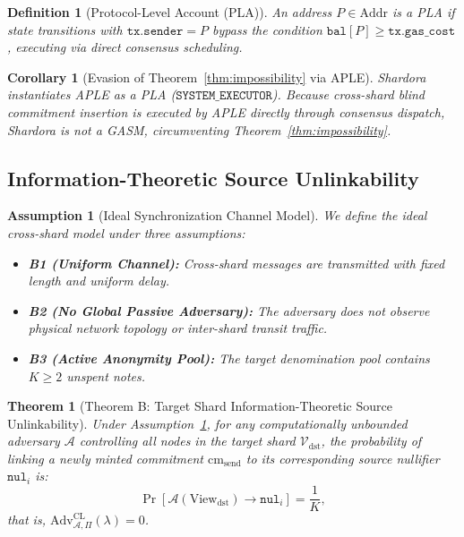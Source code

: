 \documentclass[sigconf,nonacm]{acmart}
\newtheorem{theorem}{Theorem}
\newtheorem{corollary}{Corollary}
\newtheorem{definition}{Definition}
\newtheorem{assumption}{Assumption}
\begin{document}
\begin{definition}[Protocol-Level Account (PLA)]
An address $P \in \text{Addr}$ is a PLA if state transitions with $\mathtt{tx.sender} = P$ bypass the condition $\mathtt{bal}[P] \ge \mathtt{tx.gas\_cost}$, executing via direct consensus scheduling.
\end{definition}

\begin{corollary}[Evasion of Theorem~\ref{thm:impossibility} via APLE]
Shardora instantiates APLE as a PLA ($\mathtt{SYSTEM\_EXECUTOR}$). Because cross-shard blind commitment insertion is executed by APLE directly through consensus dispatch, Shardora is not a GASM, circumventing Theorem~\ref{thm:impossibility}.
\end{corollary}

\subsection{Information-Theoretic Source Unlinkability}

\begin{assumption}[Ideal Synchronization Channel Model]\label{assump:ideal}
We define the ideal cross-shard model under three assumptions:
\begin{itemize}
    \item \textbf{B1 (Uniform Channel):} Cross-shard messages are transmitted with fixed length and uniform delay.
    \item \textbf{B2 (No Global Passive Adversary):} The adversary does not observe physical network topology or inter-shard transit traffic.
    \item \textbf{B3 (Active Anonymity Pool):} The target denomination pool contains $K \ge 2$ unspent notes.
\end{itemize}
\end{assumption}

\begin{theorem}[Theorem B: Target Shard Information-Theoretic Source Unlinkability]\label{thm:source_unlink}
Under Assumption~\ref{assump:ideal}, for any computationally unbounded adversary $\mathcal{A}$ controlling all nodes in the target shard $\mathcal{V}_{\text{dst}}$, the probability of linking a newly minted commitment $\text{cm}_{\text{send}}$ to its corresponding source nullifier $\mathtt{nul}_i$ is:
\begin{equation}
\Pr[\mathcal{A}(\text{View}_{\text{dst}}) \to \mathtt{nul}_i] = \frac{1}{K},
\end{equation}
that is, $\text{Adv}^{\text{CL}}_{\mathcal{A}, \Pi}(\lambda) = 0$.
\end{theorem}
\end{document}

